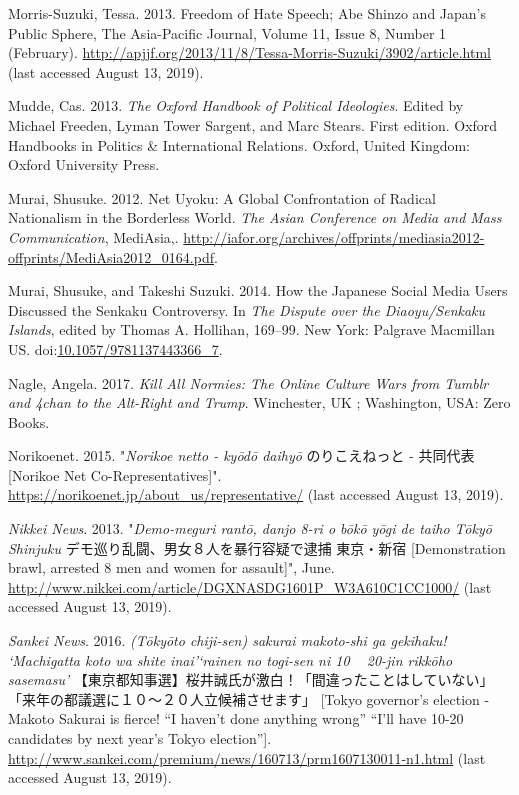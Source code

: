 \documentclass[10pt,british,A4paper,oneside]{memoir}
\begin{document}
\hypertarget{ref-morris-suzuki_freedom_2013}{}
Morris-Suzuki, Tessa. 2013. Freedom of Hate Speech; Abe Shinzo and
Japan's Public Sphere, The Asia-Pacific Journal, Volume 11, Issue 8,
Number 1 (February).
\url{http://apjjf.org/2013/11/8/Tessa-Morris-Suzuki/3902/article.html} (last accessed August 13, 2019).

\hypertarget{ref-mudde_oxford_2013}{}
Mudde, Cas. 2013. \emph{The Oxford Handbook of Political Ideologies}.
Edited by Michael Freeden, Lyman Tower Sargent, and Marc Stears. First
edition. Oxford Handbooks in Politics \& International Relations.
Oxford, United Kingdom: Oxford University Press.

\hypertarget{ref-murai_net_2012}{}
Murai, Shusuke. 2012. Net Uyoku: A Global Confrontation of Radical
Nationalism in the Borderless World. \emph{The Asian Conference on Media
and Mass Communication}, MediAsia,.
\url{http://iafor.org/archives/offprints/mediasia2012-offprints/MediAsia2012_0164.pdf}.

\hypertarget{ref-hollihan_how_2014}{}
Murai, Shusuke, and Takeshi Suzuki. 2014. How the Japanese Social Media
Users Discussed the Senkaku Controversy. In \emph{The Dispute over the
Diaoyu/Senkaku Islands}, edited by Thomas A. Hollihan, 169--99. New
York: Palgrave Macmillan US.
doi:\href{https://doi.org/10.1057/9781137443366_7}{10.1057/9781137443366\_7}.

\hypertarget{ref-nagle_kill_2017}{}
Nagle, Angela. 2017. \emph{Kill All Normies: The Online Culture Wars
from Tumblr and 4chan to the Alt-Right and Trump}. Winchester, UK ;
Washington, USA: Zero Books.

\hypertarget{ref-net_norikoe_2015}{}
Norikoenet. 2015. "\emph{Norikoe netto - kyōdō daihyō} のりこえねっと - 共同代表 [Norikoe Net Co-Representatives]".
\url{https://norikoenet.jp/about_us/representative/} (last accessed August 13, 2019).

\hypertarget{ref-nikkei_news__2013}{}
\emph{Nikkei News}. 2013. "\emph{Demo-meguri rantō, danjo 8-ri o bōkō yōgi de taiho Tōkyō Shinjuku} デモ巡り乱闘、男女８人を暴行容疑で逮捕 東京・新宿 [Demonstration brawl, arrested 8 men and women for assault]",
June. \url{http://www.nikkei.com/article/DGXNASDG1601P_W3A610C1CC1000/} (last accessed August 13, 2019).

\hypertarget{ref-sankei_news__2016}{}
\emph{Sankei News}. 2016.
\emph{(Tōkyōto chiji-sen) sakurai makoto-shi ga gekihaku! `Machigatta koto wa shite inai'`rainen no togi-sen ni 10 ~ 20-jin rikkōho sasemasu'} 【東京都知事選】桜井誠氏が激白！「間違ったことはしていない」「来年の都議選に１０～２０人立候補させます」 [Tokyo governor's election - Makoto Sakurai is fierce! “I haven’t done anything wrong” “I’ll have 10-20 candidates by next year’s Tokyo election”].
\url{http://www.sankei.com/premium/news/160713/prm1607130011-n1.html} (last accessed August 13, 2019).
\end{document}
